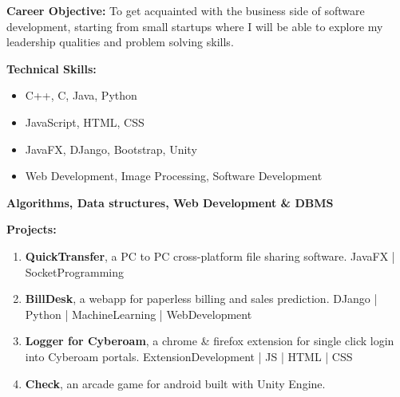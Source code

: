 \documentclass[11pt]{article}
\begin{document}
\begin{center}
\begin{minipage}[t]{0.4\textwidth}
		\end{minipage}%
		\begin{minipage}[t]{0.3\textwidth}
			\raggedright\smallskip
			\begin{LARGE}
				\textbf{Career Objective:}\medskip\linebreak%
				{\small To get acquainted with the business side of software development, starting from small startups where I will be able to explore my leadership qualities and problem solving skills.}\linebreak%
			\end{LARGE}
		\end{minipage}%
		\linebreak\linebreak\linebreak
		\begin{minipage}[t]{0.35\textwidth}
			\raggedright\smallskip
			\begin{LARGE}
				\textbf{Technical Skills:}\medskip%
				{\small
					\begin{itemize}
						\item C++, C, Java, Python
						\item JavaScript, HTML, CSS
						\item JavaFX, DJango, Bootstrap, Unity
						\item Web Development, Image Processing, Software Development
					\end{itemize}
				}
				\small \textbf{Algorithms, Data structures, Web Development \& DBMS}
			\end{LARGE}
		\end{minipage}%
		\begin{minipage}[t]{0.65\textwidth}
			\raggedright\smallskip
			\begin{LARGE}
				\textbf{Projects:}\medskip%
				{\small
					\begin{enumerate}
						\item \textbf{QuickTransfer}, a PC to PC cross-platform file sharing software.\linebreak
						JavaFX | SocketProgramming
						\item \textbf{BillDesk}, a webapp for paperless billing and sales prediction.
						DJango | Python | MachineLearning | WebDevelopment
						\item \textbf{Logger for Cyberoam}, a chrome \& firefox extension for single click login into Cyberoam portals.\linebreak
						ExtensionDevelopment | JS | HTML | CSS
						\item \textbf{Check}, an arcade game for android built with Unity Engine.\linebreak

\end{enumerate}}
\end{LARGE}
\end{minipage}
\end{center}
\end{document}
